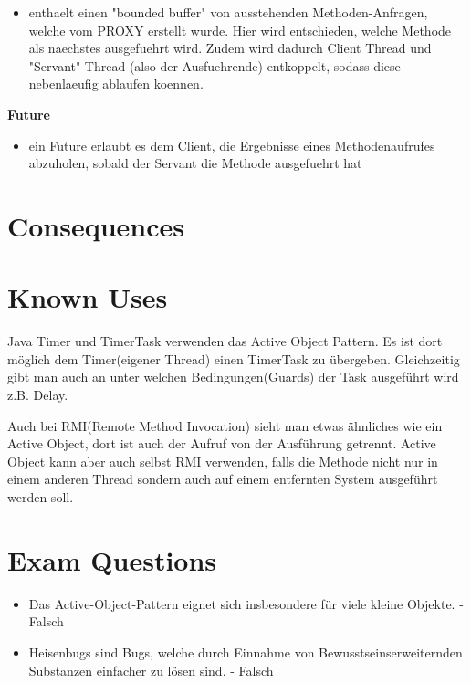 \begin{itemize}
  \item enthaelt einen "bounded buffer" von ausstehenden Methoden-Anfragen, welche vom PROXY erstellt wurde. Hier wird entschieden, welche Methode als naechstes ausgefuehrt wird. Zudem wird dadurch Client Thread und "Servant"-Thread (also der Ausfuehrende) entkoppelt, sodass diese nebenlaeufig ablaufen koennen.
\end{itemize}
\textbf{Future}
\begin{itemize}
  \item ein Future erlaubt es dem Client, die Ergebnisse eines Methodenaufrufes abzuholen, sobald der Servant die Methode ausgefuehrt hat
\end{itemize}

\section{Consequences}
\begin{itemize}
\end{itemize}

\section{Known Uses}
Java Timer und TimerTask verwenden das Active Object Pattern. Es ist dort möglich dem Timer(eigener Thread) einen TimerTask zu übergeben. Gleichzeitig gibt man auch an unter welchen Bedingungen(Guards) der Task ausgeführt wird z.B. Delay.

Auch bei RMI(Remote Method Invocation) sieht man etwas ähnliches wie ein Active Object, dort ist auch der Aufruf von der Ausführung getrennt. Active Object kann aber auch selbst RMI verwenden, falls die Methode nicht nur in einem anderen Thread sondern auch auf einem entfernten System ausgeführt werden soll.

\section{Exam Questions}
\begin{itemize}
  \item Das Active-Object-Pattern eignet sich insbesondere für viele kleine Objekte. - Falsch
  \item Heisenbugs sind Bugs, welche durch Einnahme von Bewusstseinserweiternden Substanzen einfacher zu lösen sind. - Falsch
\end{itemize}


